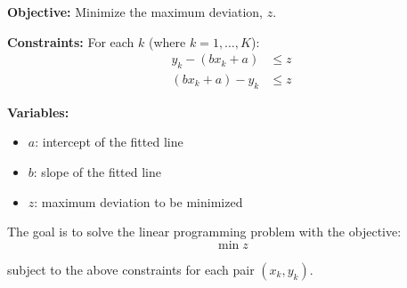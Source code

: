 \documentclass{article}
\begin{document}
\textbf{Objective:} Minimize the maximum deviation, \( z \).

\textbf{Constraints:}
For each \( k \) (where \( k = 1, \ldots, K \)):
\begin{align*}
y_k - (bx_k + a) &\leq z \\
(bx_k + a) - y_k &\leq z
\end{align*}

\textbf{Variables:}
\begin{itemize}
    \item \( a \): intercept of the fitted line
    \item \( b \): slope of the fitted line
    \item \( z \): maximum deviation to be minimized
\end{itemize}

The goal is to solve the linear programming problem with the objective:
\[
\min z
\]

subject to the above constraints for each pair \((x_k, y_k)\).
\end{document}
